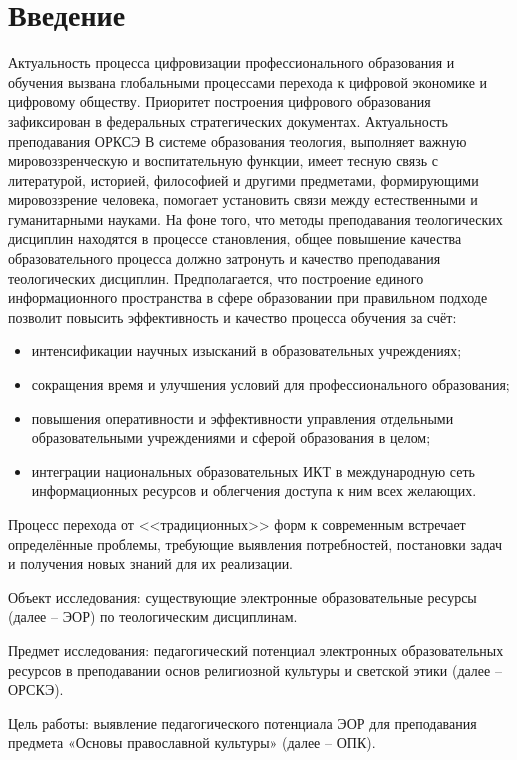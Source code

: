 \tableofcontents
\newpage
\large
\section*{Введение}
Актуальность процесса цифровизации профессионального образования и обучения вызвана глобальными процессами перехода к цифровой экономике и цифровому обществу.
Приоритет построения цифрового образования зафиксирован в федеральных стратегических документах\cite{fsd}. 
Актуальность преподавания ОРКСЭ В системе образования теология, выполняет важную мировоззренческую и воспитательную функции, имеет тесную связь с литературой, историей, философией и другими предметами, формирующими мировоззрение человека, помогает установить связи между естественными и гуманитарными науками.
На фоне того, что методы преподавания теологических дисциплин находятся в процессе становления, общее повышение качества образовательного процесса должно затронуть и качество преподавания теологических дисциплин.
Предполагается, что построение единого информационного пространства в сфере образовании при правильном подходе позволит повысить эффективность и качество процесса обучения за счёт:
\begin{itemize}
\item интенсификации научных изысканий в образовательных учреждениях;
\item сокращения время и улучшения условий для профессионального образования;
\item повышения оперативности и эффективности управления отдельными образовательными учреждениями и сферой образования в целом;
\item интеграции национальных образовательных ИКТ в международную сеть информационных ресурсов и облегчения доступа к ним всех желающих.
\end{itemize}

Процесс перехода от <<традиционных>> форм к современным встречает определённые проблемы, требующие выявления потребностей, постановки задач и получения новых знаний для их реализации.

Объект исследования: \label{obj} существующие электронные образовательные ресурсы (далее – ЭОР) по теологическим дисциплинам.

Предмет исследования: \label{subj} педагогический потенциал электронных образовательных ресурсов в преподавании основ религиозной культуры и светской этики (далее – ОРСКЭ). 

Цель работы:\label{goal}  выявление педагогического потенциала ЭОР для преподавания предмета «Основы православной культуры» (далее – ОПК). 

